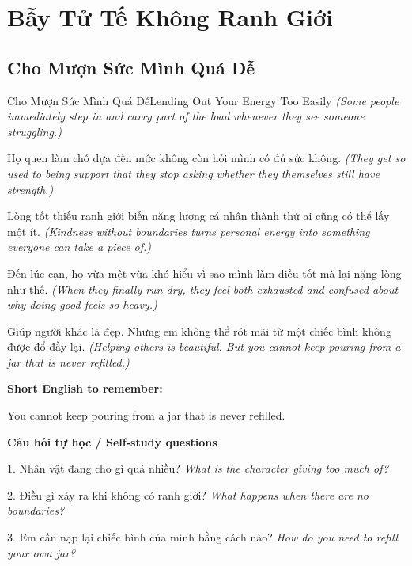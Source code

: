 \chapter{Bẫy Tử Tế Không Ranh Giới}

\section{Cho Mượn Sức Mình Quá Dễ}
\begin{truyen}{Cho Mượn Sức Mình Quá Dễ}{Lending Out Your Energy Too Easily}
\textit{(Some people immediately step in and carry part of the load whenever they see someone struggling.)}

Họ quen làm chỗ dựa đến mức không còn hỏi mình có đủ sức không.
\textit{(They get so used to being support that they stop asking whether they themselves still have strength.)}

Lòng tốt thiếu ranh giới biến năng lượng cá nhân thành thứ ai cũng có thể lấy một ít.
\textit{(Kindness without boundaries turns personal energy into something everyone can take a piece of.)}

Đến lúc cạn, họ vừa mệt vừa khó hiểu vì sao mình làm điều tốt mà lại nặng lòng như thế.
\textit{(When they finally run dry, they feel both exhausted and confused about why doing good feels so heavy.)}

\end{truyen}

\begin{baihoc}
Giúp người khác là đẹp. Nhưng em không thể rót mãi từ một chiếc bình không được đổ đầy lại.
\textit{(Helping others is beautiful. But you cannot keep pouring from a jar that is never refilled.)}
\end{baihoc}

\begin{ghinhoanh}
\textbf{Short English to remember:}

You cannot keep pouring from a jar that is never refilled.

\end{ghinhoanh}

\begin{tuhocnhanh}
\textbf{Câu hỏi tự học / Self-study questions}

1. Nhân vật đang cho gì quá nhiều? \textit{What is the character giving too much of?}

2. Điều gì xảy ra khi không có ranh giới? \textit{What happens when there are no boundaries?}

3. Em cần nạp lại chiếc bình của mình bằng cách nào? \textit{How do you need to refill your own jar?}
\end{tuhocnhanh}
\ngancach

